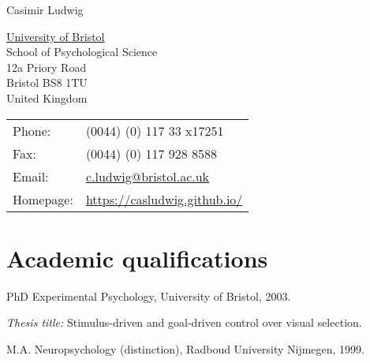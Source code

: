 \documentclass[a4paper, 10pt]{article}
\def\name{Casimir Ludwig}
\renewenvironment{itemize}{
  \begin{list}{}{
    \setlength{\leftmargin}{1.5em}
  }
}{
  \end{list}
}
\begin{document}
{\huge \name}


\vspace{0.1in}

\begin{minipage}{0.45\linewidth}
  \href{http://www.bris.ac.uk/}{University of Bristol} \\
  School of Psychological Science \\
  12a Priory Road \\
  Bristol BS8 1TU\\
  United Kingdom
\end{minipage}
\begin{minipage}{0.45\linewidth}
  \begin{tabular}{ll}
    Phone: & (0044) (0) 117 33 x17251\\
    Fax: &  (0044) (0) 117 928 8588\\
    Email: & \href{mailto:c.ludwig@bristol.ac.uk}{c.ludwig@bristol.ac.uk} \\
    Homepage: & \href{https://casludwig.github.io/}{https://casludwig.github.io/} \\
  \end{tabular}
\end{minipage}


%

\section*{Academic qualifications}
\begin{itemize}
  \item PhD Experimental Psychology, University of Bristol, 2003.
    \begin{itemize}
    \item \textit{Thesis title:}
      Stimulus-driven and goal-driven control over visual selection.
    \end{itemize}
  \item M.A. Neuropsychology (distinction), Radboud University Nijmegen, 1999.
\end{itemize}
\end{document}
